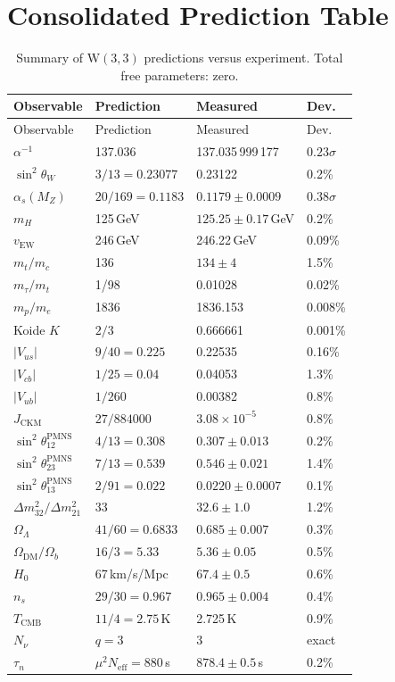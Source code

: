 \documentclass[12pt,a4paper]{article}
\newcommand{\W}{\mathrm{W}(3,3)}
\begin{document}
\section{Consolidated Prediction Table}
\label{sec:predictiontable}

\begin{longtable}{@{}llll@{}}
\caption{Summary of $\W$ predictions versus experiment. Total free parameters: zero.}
\label{tab:allpredictions}\\
\toprule
Observable & Prediction & Measured & Dev.\\
\midrule
\endfirsthead
\toprule
Observable & Prediction & Measured & Dev.\\
\midrule
\endhead
$\alpha^{-1}$ & 137.036 & 137.035\,999\,177 & $0.23\sigma$\\
$\sin^2\theta_W$ & $3/13=0.23077$ & 0.23122 & 0.2\%\\
$\alpha_s(M_Z)$ & $20/169=0.1183$ & $0.1179\pm 0.0009$ & $0.38\sigma$\\
$m_H$ & 125\,GeV & $125.25\pm 0.17$\,GeV & 0.2\%\\
$v_{\mathrm{EW}}$ & 246\,GeV & 246.22\,GeV & 0.09\%\\
$m_t/m_c$ & 136 & $134\pm 4$ & 1.5\%\\
$m_\tau/m_t$ & 1/98 & 0.01028 & 0.02\%\\
$m_p/m_e$ & 1836 & 1836.153 & 0.008\%\\
Koide $K$ & $2/3$ & 0.666661 & 0.001\%\\
$|V_{us}|$ & $9/40=0.225$ & 0.22535 & 0.16\%\\
$|V_{cb}|$ & $1/25=0.04$ & 0.04053 & 1.3\%\\
$|V_{ub}|$ & $1/260$ & 0.00382 & 0.8\%\\
$J_{\mathrm{CKM}}$ & $27/884000$ & $3.08\times 10^{-5}$ & 0.8\%\\
$\sin^2\theta_{12}^{\mathrm{PMNS}}$ & $4/13=0.308$ & $0.307\pm 0.013$ & 0.2\%\\
$\sin^2\theta_{23}^{\mathrm{PMNS}}$ & $7/13=0.539$ & $0.546\pm 0.021$ & 1.4\%\\
$\sin^2\theta_{13}^{\mathrm{PMNS}}$ & $2/91=0.022$ & $0.0220\pm 0.0007$ & 0.1\%\\
$\Delta m^2_{32}/\Delta m^2_{21}$ & 33 & $32.6\pm 1.0$ & 1.2\%\\
$\Omega_\Lambda$ & $41/60=0.6833$ & $0.685\pm 0.007$ & 0.3\%\\
$\Omega_{\mathrm{DM}}/\Omega_b$ & $16/3=5.33$ & $5.36\pm 0.05$ & 0.5\%\\
$H_0$ & 67\,km/s/Mpc & $67.4\pm 0.5$ & 0.6\%\\
$n_s$ & $29/30=0.967$ & $0.965\pm 0.004$ & 0.4\%\\
$T_{\mathrm{CMB}}$ & $11/4=2.75$\,K & 2.725\,K & 0.9\%\\
$N_\nu$ & $q=3$ & 3 & exact\\
$\tau_n$ & $\mu^2 N_{\mathrm{eff}}=880$\,s & $878.4\pm 0.5$\,s & 0.2\%\\
\bottomrule
\end{longtable}
\end{document}
